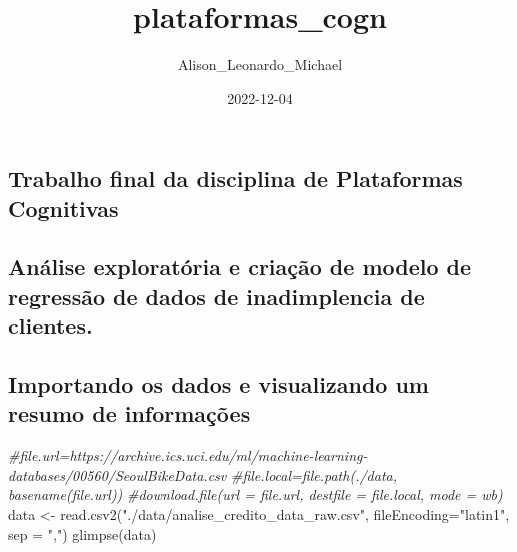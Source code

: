 \documentclass[
]{article}
\title{plataformas\_cogn}
\author{Alison\_Leonardo\_Michael}
\date{2022-12-04}
\newenvironment{Shaded}{\begin{snugshade}}{\end{snugshade}}
\newcommand{\AttributeTok}[1]{\textcolor[rgb]{0.77,0.63,0.00}{#1}}
\newcommand{\CommentTok}[1]{\textcolor[rgb]{0.56,0.35,0.01}{\textit{#1}}}
\newcommand{\FunctionTok}[1]{\textcolor[rgb]{0.00,0.00,0.00}{#1}}
\newcommand{\NormalTok}[1]{#1}
\newcommand{\OtherTok}[1]{\textcolor[rgb]{0.56,0.35,0.01}{#1}}
\newcommand{\StringTok}[1]{\textcolor[rgb]{0.31,0.60,0.02}{#1}}
\begin{document}
\maketitle

\hypertarget{trabalho-final-da-disciplina-de-plataformas-cognitivas}{%
\subsection{Trabalho final da disciplina de Plataformas
Cognitivas}\label{trabalho-final-da-disciplina-de-plataformas-cognitivas}}

\hypertarget{anuxe1lise-exploratuxf3ria-e-criauxe7uxe3o-de-modelo-de-regressuxe3o-de-dados-de-inadimplencia-de-clientes.}{%
\subsection{Análise exploratória e criação de modelo de regressão de
dados de inadimplencia de
clientes.}\label{anuxe1lise-exploratuxf3ria-e-criauxe7uxe3o-de-modelo-de-regressuxe3o-de-dados-de-inadimplencia-de-clientes.}}

\hypertarget{importando-os-dados-e-visualizando-um-resumo-de-informauxe7uxf5es}{%
\subsection{Importando os dados e visualizando um resumo de
informações}\label{importando-os-dados-e-visualizando-um-resumo-de-informauxe7uxf5es}}

\begin{Shaded}
\begin{Highlighting}[]
\CommentTok{\#file.url=\textquotesingle{}https://archive.ics.uci.edu/ml/machine{-}learning{-}databases/00560/SeoulBikeData.csv\textquotesingle{}}
\CommentTok{\#file.local=file.path(\textquotesingle{}./data\textquotesingle{}, basename(file.url))}
\CommentTok{\#download.file(url = file.url, destfile = file.local, mode = \textquotesingle{}wb\textquotesingle{})}
\NormalTok{data }\OtherTok{\textless{}{-}} \FunctionTok{read.csv2}\NormalTok{(}\StringTok{"./data/analise\_credito\_data\_raw.csv"}\NormalTok{, }\AttributeTok{fileEncoding=}\StringTok{"latin1"}\NormalTok{, }\AttributeTok{sep =} \StringTok{","}\NormalTok{)}
\FunctionTok{glimpse}\NormalTok{(data)}
\end{Highlighting}
\end{Shaded}
\end{document}

